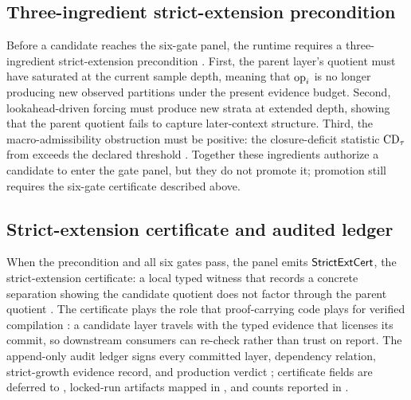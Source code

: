 \documentclass{article}
\theoremstyle{definition}
\begin{document}
\subsection{Three-ingredient strict-extension precondition}\label{subsec:three-ingredient}

Before a candidate reaches the six-gate panel, the runtime requires a three-ingredient strict-extension precondition \cite{Tsiokos2026CantorShell}. First, the parent layer's quotient must have saturated at the current sample depth, meaning that $\mathrm{op}_{i}$ is no longer producing new observed partitions under the present evidence budget. Second, lookahead-driven forcing must produce new strata at extended depth, showing that the parent quotient fails to capture later-context structure. Third, the macro-admissibility obstruction must be positive: the closure-deficit statistic $\mathrm{CD}_{\tau}$ from  exceeds the declared threshold \cite{Tsiokos2026NoGo}. Together these ingredients authorize a candidate to enter the gate panel, but they do not promote it; promotion still requires the six-gate certificate described above.

\subsection{Strict-extension certificate and audited ledger}\label{subsec:strict-cert-ledger}

When the precondition and all six gates pass, the panel emits $\mathsf{StrictExtCert}$, the strict-extension certificate: a local typed witness that records a concrete separation showing the candidate quotient does not factor through the parent quotient \cite{Tsiokos2026CantorShell}. The certificate plays the role that proof-carrying code plays for verified compilation \cite{Necula1997PCC}: a candidate layer travels with the typed evidence that licenses its commit, so downstream consumers can re-check rather than trust on report. The append-only audit ledger signs every committed layer, dependency relation, strict-growth evidence record, and production verdict \cite{Tsiokos2026FoundationsIII}; certificate fields are deferred to , locked-run artifacts mapped in , and counts reported in .
\end{document}
